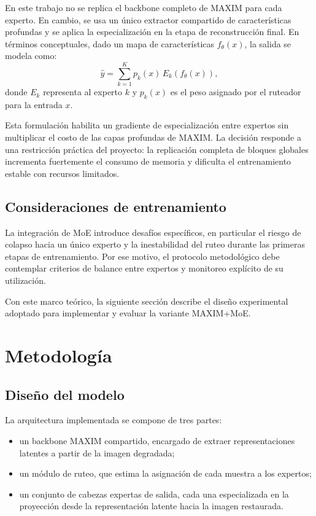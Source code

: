 \documentclass[aps,prl,twocolumn,groupedaddress]{revtex4-2}
\begin{document}
En este trabajo no se replica el backbone completo de MAXIM para cada experto. En cambio, se usa un único extractor compartido de características profundas y se aplica la especialización en la etapa de reconstrucción final. En términos conceptuales, dado un mapa de características $f_\theta(x)$, la salida se modela como:
\begin{equation}
\hat{y} = \sum_{k=1}^{K} p_k(x)\, E_k(f_\theta(x)),
\end{equation}
donde $E_k$ representa al experto $k$ y $p_k(x)$ es el peso asignado por el ruteador para la entrada $x$.

Esta formulación habilita un gradiente de especialización entre expertos sin multiplicar el costo de las capas profundas de MAXIM. La decisión responde a una restricción práctica del proyecto: la replicación completa de bloques globales incrementa fuertemente el consumo de memoria y dificulta el entrenamiento estable con recursos limitados.

\subsection{Consideraciones de entrenamiento}

La integración de MoE introduce desafíos específicos, en particular el riesgo de colapso hacia un único experto y la inestabilidad del ruteo durante las primeras etapas de entrenamiento. Por ese motivo, el protocolo metodológico debe contemplar criterios de balance entre expertos y monitoreo explícito de su utilización.

Con este marco teórico, la siguiente sección describe el diseño experimental adoptado para implementar y evaluar la variante MAXIM+MoE.

\section{Metodología}

\subsection{Diseño del modelo}

La arquitectura implementada se compone de tres partes:
\begin{itemize}
    \item un backbone MAXIM compartido, encargado de extraer representaciones latentes a partir de la imagen degradada;
    \item un módulo de ruteo, que estima la asignación de cada muestra a los expertos;
    \item un conjunto de cabezas expertas de salida, cada una especializada en la proyección desde la representación latente hacia la imagen restaurada.
\end{itemize}
\end{document}
